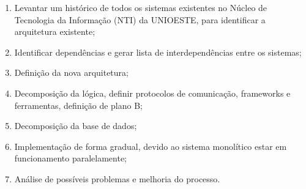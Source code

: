 \documentclass[12pt]{article}
\begin{document}
\begin{enumerate}
	\item Levantar um histórico de todos os sistemas existentes no Núcleo de Tecnologia da Informação (NTI) da UNIOESTE, para identificar a arquitetura existente;
	\item Identificar dependências e gerar lista de interdependências entre os sistemas;
	\item Definição da nova arquitetura;
	\item Decomposição da lógica, definir protocolos de comunicação, frameworks e ferramentas, definição de plano B;
	\item Decomposição da base de dados;
	\item Implementação de forma gradual, devido ao sistema monolítico estar em funcionamento paralelamente;
	\item Análise de possíveis problemas e melhoria do processo.
	
\end{enumerate}





\end{document}
